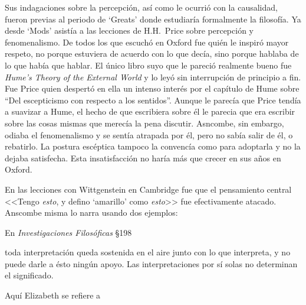 Sus indagaciones sobre la percepción, así como le ocurrió con la causalidad,
fueron previas al periodo de `Greats' donde estudiaría formalmente la filosofía.
Ya desde `Mods' asistía a las lecciones de H.H.~Price sobre percepción y
fenomenalismo. De todos los que escuchó en Oxford fue quién le inspiró mayor
respeto, no porque estuviera de acuerdo con lo que decía, sino porque hablaba de
lo que había que hablar. El único libro suyo que le pareció realmente bueno fue
\emph{Hume's Theory of the External World} y lo leyó sin interrupción de
principio a fin. Fue Price quien despertó en ella un intenso interés por el
capítulo de Hume sobre ``Del escepticismo con respecto a los sentidos''. Aunque
le parecía que Price tendía a suavizar a Hume, el hecho de que escribiera sobre
él le parecia que era escribir sobre las cosas mismas que merecía la pena
discutir. Asncombe, sin embargo, odiaba el fenomenalismo y se sentía atrapada
por él, pero no sabía salir de él, o rebatirlo. La postura escéptica tampoco la
convencía como para adoptarla y no la dejaba satisfecha. Esta insatisfacción no
haría más que crecer en sus años en Oxford.
\autocites[cf.~][p.~viii]{anscombe1981metaphysicsintro}
[~y~][p.~26]{torralba2005accion}


  En las lecciones con Wittgenstein en Cambridge fue que el pensamiento central
  <<Tengo \emph{esto}, y defino `amarillo' como \emph{esto}>> fue efectivamente
  atacado. Anscombe misma lo narra usando dos ejemplos:


En \emph{Investigaciones Filosóficas} \S198 

toda interpretación queda sostenida en el aire junto con lo que interpreta, y no
puede darle a ésto ningún apoyo. Las interpretaciones por sí solas no determinan
el significado.

  Aquí Elizabeth se refiere a \autocite[p.~86~\S198]{PI}


